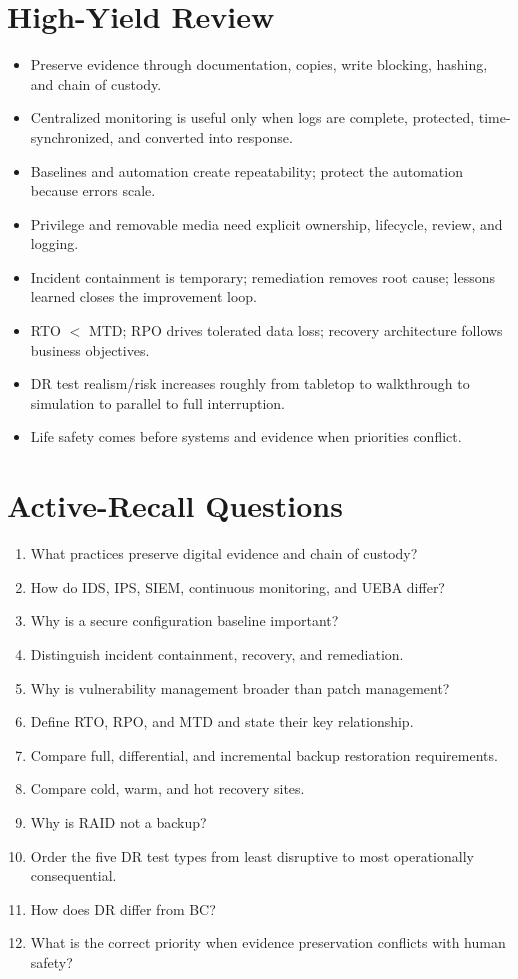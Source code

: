 \documentclass[10pt,letterpaper]{article}
\begin{document}
\section{\color{navy}High-Yield Review}
\begin{itemize}
\item Preserve evidence through documentation, copies, write blocking, hashing, and chain of custody.
\item Centralized monitoring is useful only when logs are complete, protected, time-synchronized, and converted into response.
\item Baselines and automation create repeatability; protect the automation because errors scale.
\item Privilege and removable media need explicit ownership, lifecycle, review, and logging.
\item Incident containment is temporary; remediation removes root cause; lessons learned closes the improvement loop.
\item RTO \(<\) MTD; RPO drives tolerated data loss; recovery architecture follows business objectives.
\item DR test realism/risk increases roughly from tabletop to walkthrough to simulation to parallel to full interruption.
\item Life safety comes before systems and evidence when priorities conflict.
\end{itemize}

\section{\color{navy}Active-Recall Questions}
\begin{enumerate}
\item What practices preserve digital evidence and chain of custody?
\item How do IDS, IPS, SIEM, continuous monitoring, and UEBA differ?
\item Why is a secure configuration baseline important?
\item Distinguish incident containment, recovery, and remediation.
\item Why is vulnerability management broader than patch management?
\item Define RTO, RPO, and MTD and state their key relationship.
\item Compare full, differential, and incremental backup restoration requirements.
\item Compare cold, warm, and hot recovery sites.
\item Why is RAID not a backup?
\item Order the five DR test types from least disruptive to most operationally consequential.
\item How does DR differ from BC?
\item What is the correct priority when evidence preservation conflicts with human safety?
\end{enumerate}
\end{document}
